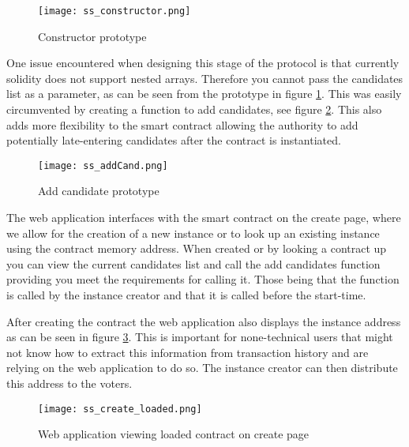 \documentclass{entcs}
\begin{document}
\begin{figure}[h!]
    \centering
    \texttt{[image: ss\_constructor.png]}
    \caption{Constructor prototype}
    \label{fig:constructor}
\end{figure}


One issue encountered when designing this stage of the protocol is that currently solidity does not support nested arrays. Therefore you cannot pass the candidates list as a parameter, as can be seen from the prototype in figure \ref{fig:constructor}. This was easily circumvented by creating a function to add candidates, see figure \ref{fig:addCand}. This also adds more flexibility to the smart contract allowing the authority to add potentially late-entering candidates after the contract is instantiated. 

\begin{figure}[h!]
    \centering
    \texttt{[image: ss\_addCand.png]}
    \caption{Add candidate prototype}
    \label{fig:addCand}
\end{figure}

The web application interfaces with the smart contract on the create page, where we allow for the creation of a new instance or to look up an existing instance using the contract memory address. When created or by looking a contract up you can view the current candidates list and call the add candidates function providing you meet the requirements for calling it. Those being that the function is called by the instance creator and that it is called before the start-time.

After creating the contract the web application also displays the instance address as can be seen in figure \ref{fig:create_loaded}. This is important for none-technical users that might not know how to extract this information from transaction history and are relying on the web application to do so. The instance creator can then distribute this address to the voters.

\begin{figure}[h!]
    \centering
    \texttt{[image: ss\_create\_loaded.png]}
    \caption{Web application viewing loaded contract on create page}
    \label{fig:create_loaded}
\end{figure}

\end{document}
